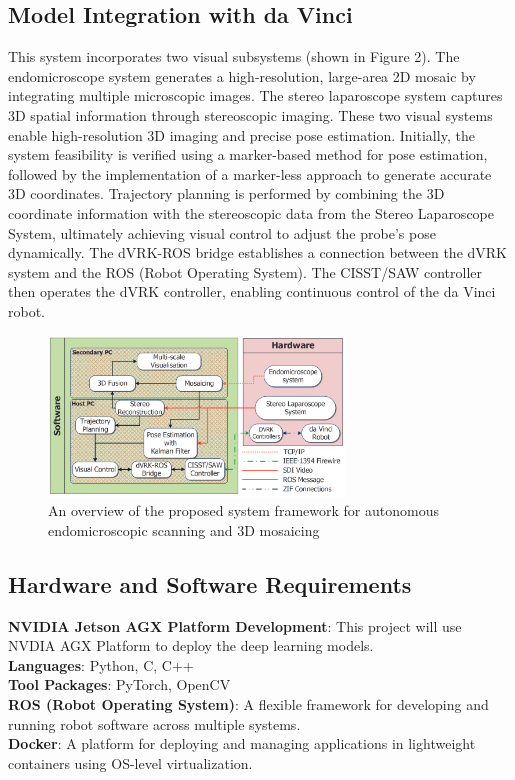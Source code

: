 \documentclass[12pt]{article}
\begin{document}
\subsection{Model Integration with da Vinci}
This system incorporates two visual subsystems (shown in Figure 2)\cite{7989412}. The endomicroscope system generates a high-resolution, large-area 2D mosaic by integrating multiple microscopic images. The stereo laparoscope system captures 3D spatial information through stereoscopic imaging. These two visual systems enable high-resolution 3D imaging and precise pose estimation. Initially, the system feasibility is verified using a marker-based method for pose estimation, followed by the implementation of a marker-less approach to generate accurate 3D coordinates. Trajectory planning is performed by combining the 3D coordinate information with the stereoscopic data from the Stereo Laparoscope System, ultimately achieving visual control to adjust the probe’s pose dynamically. The dVRK-ROS bridge establishes a connection between the dVRK system and the ROS (Robot Operating System). The CISST/SAW controller then operates the dVRK controller, enabling continuous control of the da Vinci robot.

\begin{figure}[H]
            \centering
            \includegraphics[width=0.7\textwidth]{model integration.png}
            \caption{An overview of the proposed system framework for autonomous endomicroscopic scanning and 3D mosaicing\cite{7989412}}
      \end{figure}



\subsection{Hardware and Software Requirements}
\textbf{NVIDIA Jetson AGX Platform Development}: This project will use NVDIA AGX Platform to deploy the deep learning models.\\
\textbf{Languages}: Python, C, C++ \\
\textbf{Tool Packages}: PyTorch, OpenCV \\
\textbf{ROS (Robot Operating System)}: A flexible framework for developing and running robot software across multiple systems. \\
\textbf{Docker}: A platform for deploying and managing applications in lightweight containers using OS-level virtualization.
\end{document}
